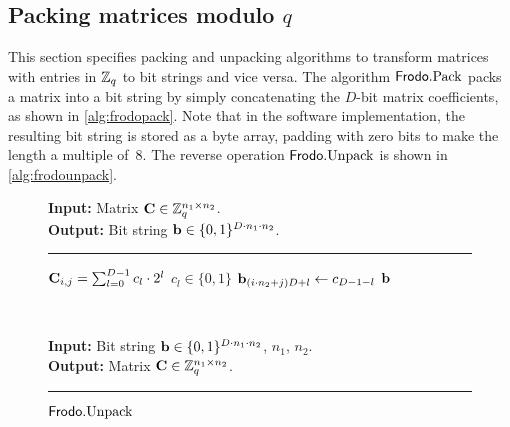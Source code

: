 \documentclass{iacrcc}
\begin{document}
\subsection{Packing matrices modulo $q$}
\label{sec:pack}

This section specifies packing and unpacking algorithms to transform
matrices with entries in $\mathbb{Z}_q$ to bit strings and vice versa. The
algorithm $\Frodo.\Pack$ packs a matrix into a bit string by simply
concatenating the $D$-bit matrix coefficients, as shown in
\autoref{alg:frodopack}. Note that in the software implementation, the
resulting bit string is stored as a byte array, padding with zero bits
to make the length a multiple of~$8$. The reverse operation
$\textsf{\upshape\mdseries Frodo}.\textrm{\upshape\mdseries Unpack}$ is shown in \autoref{alg:frodounpack}.

\begin{figure}[h!]
\centering
\begin{minipage}[t]{0.45\textwidth}
\begin{algorithm}[H]
\caption{\label{alg:frodopack} $\Frodo.\Pack$}
{\bf Input:} Matrix $\mathbf{C} \in \mathbb{Z}_q^{n_1\times n_2}$.\\
{\bf Output:} Bit string $\mathbf{b} \in \{0,1\}^{D\cdot n_1\cdot n_2}$.\\[-1.5ex]
\rule{\linewidth}{.5pt}
\vspace{-0.5cm}
\begin{algorithmic}[1]
    \STATE $\mathbf{C}_{i,j} = \sum_{l=0}^{D-1}c_l \cdot 2^l$  $c_l\in \{0,1\}$
    \STATE $\mathbf{b}_{(i\cdot n_2  + j)D+l} \gets c_{D-1-l}$ 
    \ENDFOR
    \ENDFOR
    \ENDFOR
    \RETURN $\mathbf{b}$
\end{algorithmic}
\end{algorithm}
\end{minipage}
~
\begin{minipage}[t]{0.5\textwidth}
\begin{algorithm}[H]
\caption{\label{alg:frodounpack} $\textsf{\upshape\mdseries Frodo}.\textrm{\upshape\mdseries Unpack}$}
{\bf Input:}  Bit string $\mathbf{b} \in \{0,1\}^{D\cdot n_1\cdot n_2}$, $n_1$, $n_2$.\\
{\bf Output:} Matrix $\mathbf{C} \in \mathbb{Z}_q^{n_1\times n_2}$.\\[-1.5ex]
\rule{\linewidth}{.5pt}

\end{algorithm}
\end{minipage}
\end{figure}
\end{document}
